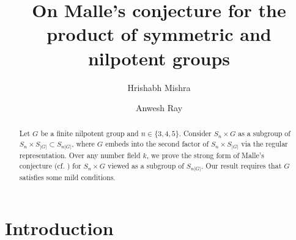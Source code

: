 \documentclass[11pt]{amsart}
\numberwithin{equation}{section}
\begin{document}
\title[On Malle's conjecture for $S_n\times G$]{On Malle's conjecture for the product of symmetric and nilpotent groups}


\author[H.~Mishra]{Hrishabh Mishra}
\address[H.~Mishra]{Chennai Mathematical Institute, H1, SIPCOT IT Park, Kelambakkam, Siruseri, Tamil Nadu 603103, India}

\author[A.~Ray]{Anwesh Ray}
\address[A.~Ray]{Chennai Mathematical Institute, H1, SIPCOT IT Park, Kelambakkam, Siruseri, Tamil Nadu 603103, India}

\keywords{}
\subjclass[2020]{}

\maketitle


\begin{abstract}
 Let $G$ be a finite nilpotent group and $n\in \{3,4, 5\}$. Consider $S_n\times G$ as a subgroup of $S_n\times S_{|G|}\subset S_{n|G|}$, where $G$ embeds into the second factor of $S_n\times S_{|G|}$ via the regular representation. Over any number field $k$, we prove the strong form of Malle's conjecture (cf. \cite[p.316]{malle2002distribution}) for $S_n\times G$ viewed as a subgroup of $S_{n|G|}$. Our result requires that $G$ satisfies some mild conditions. 
\end{abstract}

\section{Introduction}
\end{document}
